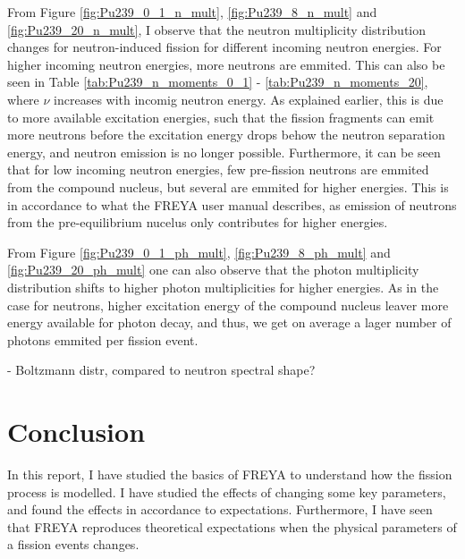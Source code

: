 \documentclass[]{article}
\begin{document}
From Figure \ref{fig:Pu239_0_1_n_mult}, \ref{fig:Pu239_8_n_mult} and \ref{fig:Pu239_20_n_mult}, I observe that the neutron multiplicity distribution changes for neutron-induced fission for different incoming neutron energies. For higher incoming neutron energies, more neutrons are emmited. This can also be seen in Table \ref{tab:Pu239_n_moments_0_1} - \ref{tab:Pu239_n_moments_20}, where $\nu$ increases with incomig neutron energy. As explained earlier, this is due to more available excitation energies, such that the fission fragments can emit more neutrons before the excitation energy drops behow the neutron separation energy, and neutron emission is no longer possible. Furthermore, it can be seen that for low incoming neutron energies, few pre-fission neutrons are emmited from the compound nucleus, but several are emmited for higher energies. This is in accordance to what the FREYA user manual describes, as emission of neutrons from the pre-equilibrium nucelus only contributes for higher energies.

From Figure \ref{fig:Pu239_0_1_ph_mult}, \ref{fig:Pu239_8_ph_mult} and \ref{fig:Pu239_20_ph_mult} one can also observe that the photon multiplicity distribution shifts to higher photon multiplicities for higher energies. As in the case for neutrons, higher excitation energy of the compound nucleus leaver more energy available for photon decay, and thus, we get on average a lager number of photons emmited per fission event.

- Boltzmann distr, compared to neutron spectral shape?


\section{Conclusion}
In this report, I have studied the basics of FREYA to understand how the fission process is modelled. I have studied the effects of changing some key parameters, and found the effects in accordance to expectations. Furthermore, I have seen that FREYA reproduces theoretical expectations when the physical parameters of a fission events changes.



\vspace{3mm}

\newpage



\end{document}
